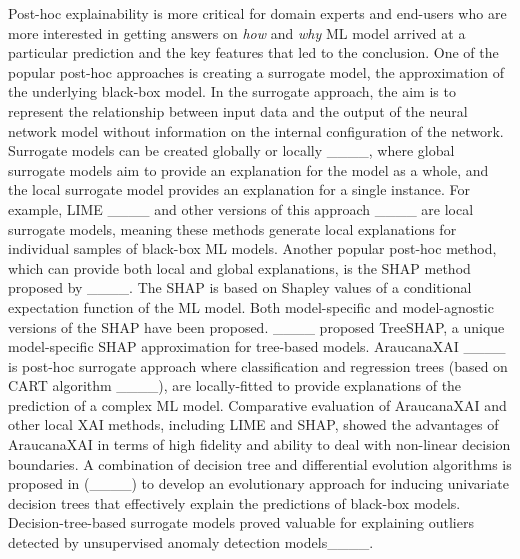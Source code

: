 Post-hoc explainability is more critical for domain experts and end-users who are more interested in getting answers on \textit{how} and \textit{why} ML model arrived at a particular prediction and the key features that led to the conclusion. One of the popular post-hoc approaches is creating a surrogate model, the approximation of the underlying black-box model. In the surrogate approach, the aim is to represent the relationship between input data and the output of the neural network model without information on the internal configuration of the network. Surrogate models can be created globally or locally ____, where global surrogate models aim to provide an explanation for the model as a whole, and the local surrogate model provides an explanation for a single instance. For example, LIME ____ and other versions of this approach ____ are local surrogate models, meaning these methods generate local explanations for individual samples of black-box ML models. Another popular post-hoc method, which can provide both local and global explanations, is the SHAP method proposed by ____. The SHAP is based on Shapley values of a conditional expectation function of the ML model. Both model-specific and model-agnostic versions of the SHAP have been proposed. ____ proposed TreeSHAP, a unique model-specific SHAP approximation for tree-based models. AraucanaXAI ____ is post-hoc surrogate approach where classification and regression trees (based on CART algorithm ____), are locally-fitted to provide explanations of the prediction of a complex ML model. Comparative evaluation of AraucanaXAI and other local XAI methods, including LIME and SHAP, showed the advantages of AraucanaXAI in terms of high fidelity and ability to deal with non-linear decision boundaries. A combination of decision tree and differential evolution algorithms is proposed in (____) to develop an evolutionary approach for inducing univariate decision trees that effectively explain the predictions of black-box models. Decision-tree-based surrogate models proved valuable for explaining outliers detected by unsupervised anomaly detection models____.

